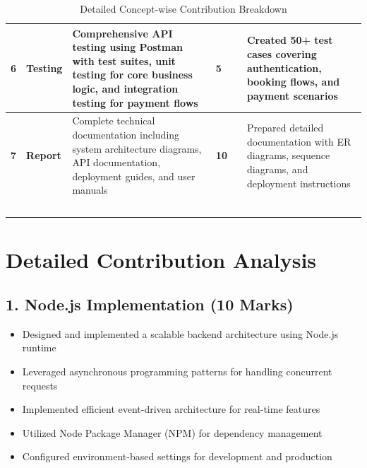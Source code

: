 \documentclass[12pt,a4paper]{article}
\begin{document}
\begin{table}[h!]
\begin{tabular}{|>{\centering\arraybackslash}p{1cm}|p{2.2cm}|p{3.5cm}|>{\centering\arraybackslash}p{1.5cm}|>{\centering\arraybackslash}p{1.5cm}|p{4cm}|}
\textbf{6} & \textbf{Testing} & Comprehensive API testing using Postman with test suites, unit testing for core business logic, and integration testing for payment flows & \textbf{5} & & Created 50+ test cases covering authentication, booking flows, and payment scenarios \\
\hline
\rowcolor{lightgray}
\textbf{7} & \textbf{Report} & Complete technical documentation including system architecture diagrams, API documentation, deployment guides, and user manuals & \textbf{10} & & Prepared detailed documentation with ER diagrams, sequence diagrams, and deployment instructions \\
\hline
\hline
\rowcolor{headerblue}
\multicolumn{3}{|r|}{\textcolor{white}{\textbf{TOTAL}}} & \textcolor{white}{\textbf{50}} & & \\
\hline
\end{tabular}
\caption{Detailed Concept-wise Contribution Breakdown}
\renewcommand{\arraystretch}{1}
\end{table}

\newpage

\section*{Detailed Contribution Analysis}

\subsection*{1. Node.js Implementation (10 Marks)}
\begin{itemize}[leftmargin=*]
    \item Designed and implemented a scalable backend architecture using Node.js runtime
    \item Leveraged asynchronous programming patterns for handling concurrent requests
    \item Implemented efficient event-driven architecture for real-time features
    \item Utilized Node Package Manager (NPM) for dependency management
    \item Configured environment-based settings for development and production
\end{itemize}
\end{document}
